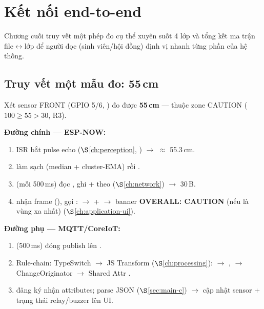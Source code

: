 
\chapter{Kết nối end-to-end}
\label{ch:endtoend}

Chương cuối truy vết một phép đo cụ thể xuyên suốt 4 lớp và tổng kết ma trận
file$\leftrightarrow$lớp để người đọc (sinh viên/hội đồng) định vị nhanh từng phần của hệ thống.

\section{Truy vết một mẫu đo: 55\,cm}
\label{sec:trace}

Xét sensor FRONT (GPIO 5/6, ) đo được \textbf{55\,cm} — thuộc
zone CAUTION ($100 \ge 55 > 30$, R3).

\textbf{Đường chính — ESP-NOW:}
\begin{enumerate}
\item ISR  bắt pulse echo
  ($\S$\ref{ch:perception}, ) $\rightarrow$
   $\approx$ 55.3\,cm.
\item {} làm sạch (median + cluster-EMA) rồi
  .
\item {} (mỗi 500\,ms) đọc , ghi
   +  theo
   ($\S$\ref{ch:network}) $\rightarrow$
   30\,B.
\item {} nhận frame (), gọi
  : 
  $\rightarrow$  + 
  $\rightarrow$ banner \textbf{OVERALL: CAUTION} (nếu là vùng xa nhất)
  ($\S$\ref{ch:application-ui}).
\end{enumerate}

\textbf{Đường phụ — MQTT/CoreIoT:}
\begin{enumerate}
\item {} (500\,ms) đóng 
  publish lên .
\item Rule-chain: TypeSwitch $\rightarrow$ JS Transform ($\S$\ref{ch:processing}):
   $\rightarrow$ ,
   $\rightarrow$ ChangeOriginator $\rightarrow$
  Shared Attr .
\item {} đăng ký nhận attributes; parse JSON
   ($\S$\ref{sec:main-c}) $\rightarrow$ cập nhật
  sensor + trạng thái relay/buzzer lên UI.
\end{enumerate}

